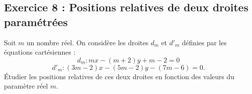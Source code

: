 \documentclass[11pt,a4paper]{article}
\begin{document}
\vspace{0.6cm}
\subsection*{Exercice 8 : Positions relatives de deux droites paramétrées}

\begin{enoncebox}
Soit $m$ un nombre réel. On considère les droites $d_m$ et $d'_m$ définies par les équations cartésiennes :
\[
d_m : mx - (m + 2)y + m - 2 = 0
\]
\[
d'_m : (3m - 2)x - (5m - 2)y - (7m - 6) = 0.
\]
Étudier les positions relatives de ces deux droites en fonction des valeurs du paramètre réel $m$.
\end{enoncebox}
\end{document}
